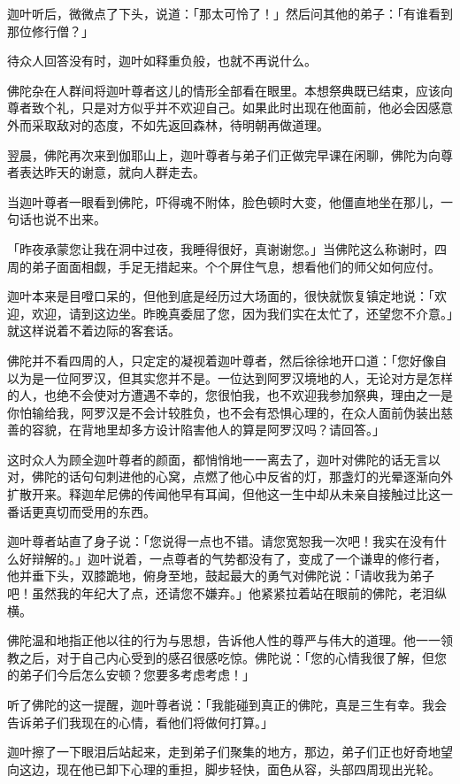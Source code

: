 \documentclass[12pt,twoside,openany]{book}
\begin{document}
迦叶听后，微微点了下头，说道：「那太可怜了！」然后问其他的弟子：「有谁看到那位修行僧？」

待众人回答没有时，迦叶如释重负般，也就不再说什么。

佛陀杂在人群间将迦叶尊者这儿的情形全部看在眼里。本想祭典既已结束，应该向尊者致个礼，只是对方似乎并不欢迎自己。如果此时出现在他面前，他必会因感意外而采取敌对的态度，不如先返回森林，待明朝再做道理。

翌晨，佛陀再次来到伽耶山上，迦叶尊者与弟子们正做完早课在闲聊，佛陀为向尊者表达昨天的谢意，就向人群走去。

当迦叶尊者一眼看到佛陀，吓得魂不附体，脸色顿时大变，他僵直地坐在那儿，一句话也说不出来。

「昨夜承蒙您让我在洞中过夜，我睡得很好，真谢谢您。」当佛陀这么称谢时，四周的弟子面面相觑，手足无措起来。个个屏住气息，想看他们的师父如何应付。

迦叶本来是目噔口呆的，但他到底是经历过大场面的，很快就恢复镇定地说：「欢迎，欢迎，请到这边坐。昨晚真委屈了您，因为我们实在太忙了，还望您不介意。」就这样说着不着边际的客套话。

佛陀并不看四周的人，只定定的凝视着迦叶尊者，然后徐徐地开口道：「您好像自以为是一位阿罗汉，但其实您并不是。一位达到阿罗汉境地的人，无论对方是怎样的人，也绝不会使对方遭遇不幸的，您很怕我，也不欢迎我参加祭典，理由之一是你怕输给我，阿罗汉是不会计较胜负，也不会有恐惧心理的，在众人面前伪装出慈善的容貌，在背地里却多方设计陷害他人的算是阿罗汉吗？请回答。」

这时众人为顾全迦叶尊者的颜面，都悄悄地一一离去了，迦叶对佛陀的话无言以对，佛陀的话句句刺进他的心窝，点燃了他心中反省的灯，那盏灯的光晕逐渐向外扩散开来。释迦牟尼佛的传闻他早有耳闻，但他这一生中却从未亲自接触过比这一番话更真切而受用的东西。

迦叶尊者站直了身子说：「您说得一点也不错。请您宽恕我一次吧！我实在没有什么好辩解的。」迦叶说着，一点尊者的气势都没有了，变成了一个谦卑的修行者，他并垂下头，双膝跪地，俯身至地，鼓起最大的勇气对佛陀说：「请收我为弟子吧！虽然我的年纪大了点，还请您不嫌弃。」他紧紧拉着站在眼前的佛陀，老泪纵横。

佛陀温和地指正他以往的行为与思想，告诉他人性的尊严与伟大的道理。他一一领教之后，对于自己内心受到的感召很感吃惊。佛陀说：「您的心情我很了解，但您的弟子们今后怎么安顿？您要多考虑考虑！」

听了佛陀的这一提醒，迦叶尊者说：「我能碰到真正的佛陀，真是三生有幸。我会告诉弟子们我现在的心情，看他们将做何打算。」

迦叶擦了一下眼泪后站起来，走到弟子们聚集的地方，那边，弟子们正也好奇地望向这边，现在他已卸下心理的重担，脚步轻快，面色从容，头部四周现出光轮。
\end{document}
